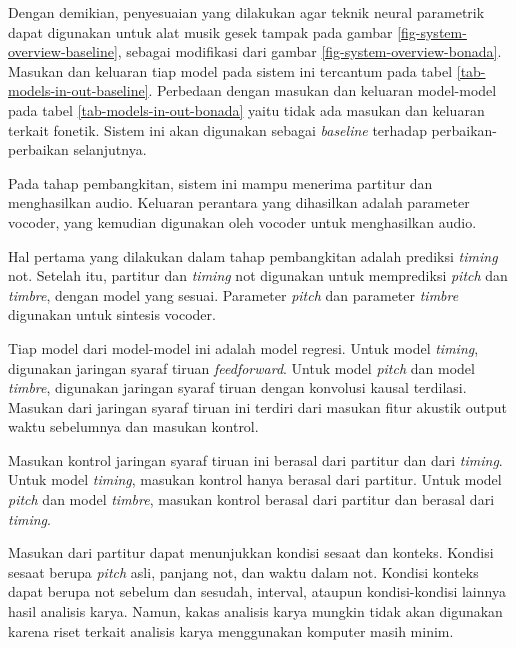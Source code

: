 Dengan demikian, penyesuaian yang dilakukan agar teknik neural parametrik dapat digunakan untuk alat musik gesek tampak pada gambar \ref{fig-system-overview-baseline}, sebagai modifikasi dari gambar \ref{fig-system-overview-bonada}. Masukan dan keluaran tiap model pada sistem ini tercantum pada tabel \ref{tab-models-in-out-baseline}. Perbedaan dengan masukan dan keluaran model-model pada tabel \ref{tab-models-in-out-bonada} yaitu tidak ada masukan dan keluaran terkait fonetik. Sistem ini akan digunakan sebagai \textit{baseline} terhadap perbaikan-perbaikan selanjutnya.

Pada tahap pembangkitan, sistem ini mampu menerima partitur dan menghasilkan audio. Keluaran perantara yang dihasilkan adalah parameter vocoder, yang kemudian digunakan oleh vocoder untuk menghasilkan audio.

Hal pertama yang dilakukan dalam tahap pembangkitan adalah prediksi \textit{timing} not. Setelah itu, partitur dan \textit{timing} not digunakan untuk memprediksi \textit{pitch} dan \textit{timbre}, dengan model yang sesuai. Parameter \textit{pitch} dan parameter \textit{timbre} digunakan untuk sintesis vocoder.

Tiap model dari model-model ini adalah model regresi. Untuk model \textit{timing}, digunakan jaringan syaraf tiruan \textit{feedforward}. Untuk model \textit{pitch} dan model \textit{timbre}, digunakan jaringan syaraf tiruan dengan konvolusi kausal terdilasi. Masukan dari jaringan syaraf tiruan ini terdiri dari masukan fitur akustik output waktu sebelumnya dan masukan kontrol.

Masukan kontrol jaringan syaraf tiruan ini berasal dari partitur dan dari \textit{timing}. Untuk model \textit{timing}, masukan kontrol hanya berasal dari partitur. Untuk model \textit{pitch} dan model \textit{timbre}, masukan kontrol berasal dari partitur dan berasal dari \textit{timing}.

Masukan dari partitur dapat menunjukkan kondisi sesaat dan konteks. Kondisi sesaat berupa \textit{pitch} asli, panjang not, dan waktu dalam not. Kondisi konteks dapat berupa not sebelum dan sesudah, interval, ataupun kondisi-kondisi lainnya hasil analisis karya. Namun, kakas analisis karya mungkin tidak akan digunakan karena riset terkait analisis karya menggunakan komputer masih minim.

